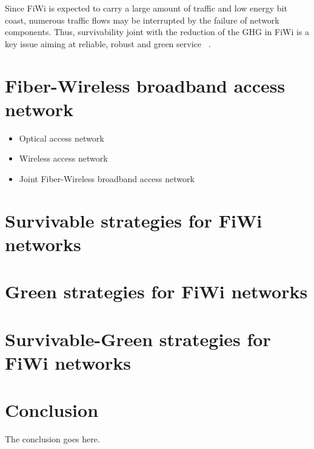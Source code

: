 \documentclass[conference,compsoc]{IEEEtran}
\begin{document}
Since FiWi is expected to carry a large amount of traffic and low energy bit coast, numerous traffic flows may be interrupted by the failure of network components. Thus, survivability  joint with the reduction of the GHG in FiWi is a key issue aiming at reliable, robust  and green service ~\cite{Liu201268}.



\section{Fiber-Wireless broadband access network}

\begin{itemize}
\item Optical access network
\item Wireless access network
\item Joint Fiber-Wireless broadband access network
\end{itemize}




\section{Survivable strategies for FiWi networks}


\section{Green strategies for FiWi networks}


\section{Survivable-Green strategies for FiWi networks}





\section{Conclusion}
The conclusion goes here.







\end{document}
